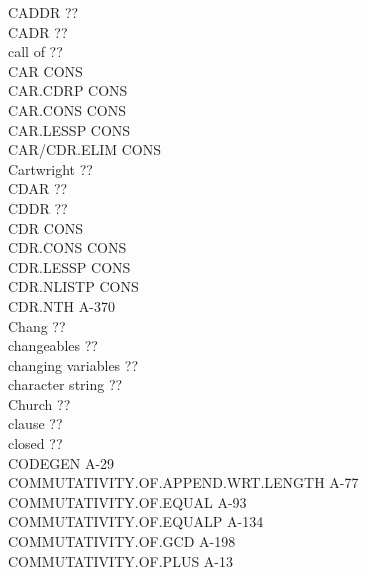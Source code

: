 \documentclass[10pt]{book}
\newenvironment{pubasis}{\begin{flushleft}}{\end{flushleft}}
\begin{document}
\begin{pubasis}
CADDR                                        ??\\
CADR                                         ??\\
call of                                      ??\\
CAR                                          CONS\\
CAR.CDRP                                     CONS\\
CAR.CONS                                     CONS\\
CAR.LESSP                                    CONS\\
CAR/CDR.ELIM                                 CONS\\
Cartwright                                   ??\\
CDAR                                         ??\\
CDDR                                         ??\\
CDR                                          CONS\\
CDR.CONS                                     CONS\\
CDR.LESSP                                    CONS\\
CDR.NLISTP                                   CONS\\
CDR.NTH                                      A-370\\
Chang                                        ??\\
changeables                                  ??\\
changing variables                           ??\\
character string                             ??\\
Church                                       ??\\
clause                                       ??\\
closed                                       ??\\
CODEGEN                                      A-29\\
COMMUTATIVITY.OF.APPEND.WRT.LENGTH           A-77\\
COMMUTATIVITY.OF.EQUAL                       A-93\\
COMMUTATIVITY.OF.EQUALP                      A-134\\
COMMUTATIVITY.OF.GCD                         A-198\\
COMMUTATIVITY.OF.PLUS                        A-13\\

\end{pubasis}
\end{document}
